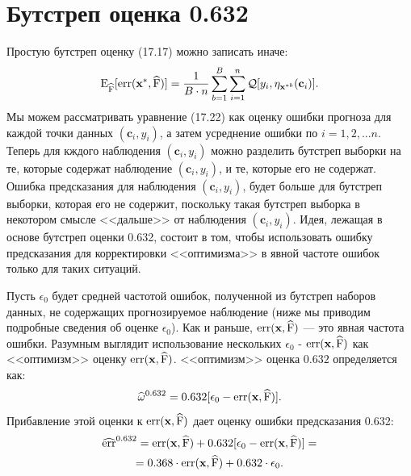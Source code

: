 \section{Бутстреп оценка 0.632}
Простую бутстреп оценку (17.17) можно записать иначе: 
\begin{equation}
\mathrm{E}_{\widehat{\text{F}}}[\text{err}(\textbf{x}^{*}, \widehat{\text{F}})] = \frac{1}{B\cdot n} \sum_{b = 1}^{B} \sum_{i = 1}^{n} \mathcal{Q}[y_{i},  \eta_{\textbf{x}^{*b}}(\textbf{c}_{i})].
\end{equation}
Мы можем рассматривать уравнение (17.22) как оценку ошибки прогноза для каждой точки данных $(\textbf{c}_{i}, y_{i})$, а затем усреднение ошибки по $i = 1, 2, ... n$. Теперь для кждого наблюдения $(\textbf{c}_{i}, y_{i})$ можно разделить бутстреп выборки на те, которые содержат наблюдение $(\textbf{c}_{i}, y_{i})$, и те, которые его не содержат. Ошибка предсказания для наблюдения $(\textbf{c}_{i}, y_{i})$, будет больше для бутстреп выборки, которая его не содержит, поскольку такая бутстреп выборка в некотором смысле <<дальше>> от наблюдения $(\textbf{c}_{i}, y_{i})$. Идея, лежащая в основе бутстреп оценки 0.632, состоит в том, чтобы использовать ошибку предсказания для корректировки <<оптимизма>> в явной частоте ошибок только для таких ситуаций.

Пусть $\epsilon_{0}$ будет средней частотой ошибок, полученной из бутстреп наборов данных, не содержащих прогнозируемое наблюдение (ниже мы приводим подробные сведения об оценке $\epsilon_{0}$). Как и раньше, $\text{err}(\textbf{x}, \widehat{\text{F}})$ --- это явная частота ошибки. Разумным выглядит использование нескольких $\epsilon_{0}$ - $\text{err}(\textbf{x}, \widehat{\text{F}})$ как <<оптимизм>> оценку  $\text{err}(\textbf{x}, \widehat{\text{F}})$. <<оптимизм>> оценка $0.632$ определяется как:
\begin{equation}
\widehat{\omega}^{0.632} = 0.632[\epsilon_{0} - \text{err}(\textbf{x}, \widehat{\text{F}})].
\end{equation}
Прибавление этой оценки к $\text{err}(\textbf{x}, \widehat{\text{F}})$ дает оценку ошибки предсказания 0.632:
\begin{equation}
\begin{gathered}
\widehat{\text{err}}^{0.632} = \text{err}(\textbf{x}, \widehat{\text{F}}) + 0.632[\epsilon_{0} - \text{err}(\textbf{x}, \widehat{\text{F}})] = \\
= 0.368 \cdot \text{err}(\textbf{x}, \widehat{\text{F}}) + 0.632 \cdot \epsilon_{0}.
\end{gathered}
\end{equation}

